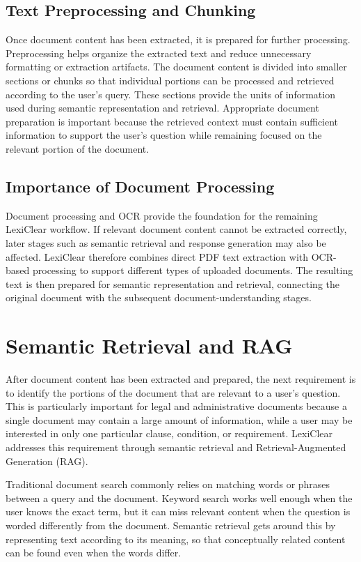 \documentclass[12pt,a4paper,oneside]{report}
\begin{document}
\subsection{Text Preprocessing and Chunking}

Once document content has been extracted, it is prepared for further
processing. Preprocessing helps organize the extracted text and reduce
unnecessary formatting or extraction artifacts. The document content is divided into smaller sections or chunks so that
individual portions can be processed and retrieved according to the user's
query. These sections provide the units of information used during semantic
representation and retrieval. Appropriate document preparation is important because the retrieved
context must contain sufficient information to support the user's question while
remaining focused on the relevant portion of the document.

\subsection{Importance of Document Processing}

Document processing and OCR provide the foundation for the remaining
LexiClear workflow. If relevant document content cannot be extracted
correctly, later stages such as semantic retrieval and response generation
may also be affected. LexiClear therefore combines direct PDF text extraction with OCR-based
processing to support different types of uploaded documents. The resulting
text is then prepared for semantic representation and retrieval, connecting
the original document with the subsequent document-understanding stages.

\section{Semantic Retrieval and RAG}

After document content has been extracted and prepared, the next requirement
is to identify the portions of the document that are relevant to a user's
question. This is particularly important for legal and administrative
documents because a single document may contain a large amount of information,
while a user may be interested in only one particular clause, condition, or
requirement. LexiClear addresses this requirement through semantic retrieval
and Retrieval-Augmented Generation (RAG).

Traditional document search commonly relies on matching words or phrases
between a query and the document. Keyword search works well enough when the user knows the exact term, but it can miss relevant content when the question is worded differently from the document. Semantic retrieval gets around this by representing text according to its meaning, so that conceptually related content can be found even when the words differ.
\end{document}
